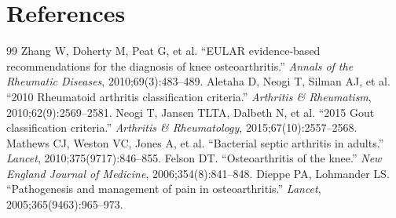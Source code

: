 \section*{References}
\begin{thebibliography}{99}
 Zhang W, Doherty M, Peat G, et al. ``EULAR evidence-based recommendations for the diagnosis of knee osteoarthritis.'' \textit{Annals of the Rheumatic Diseases}, 2010;69(3):483--489.
 Aletaha D, Neogi T, Silman AJ, et al. ``2010 Rheumatoid arthritis classification criteria.'' \textit{Arthritis \& Rheumatism}, 2010;62(9):2569--2581.
 Neogi T, Jansen TLTA, Dalbeth N, et al. ``2015 Gout classification criteria.'' \textit{Arthritis \& Rheumatology}, 2015;67(10):2557--2568.
 Mathews CJ, Weston VC, Jones A, et al. ``Bacterial septic arthritis in adults.'' \textit{Lancet}, 2010;375(9717):846--855.
 Felson DT. ``Osteoarthritis of the knee.'' \textit{New England Journal of Medicine}, 2006;354(8):841--848.
 Dieppe PA, Lohmander LS. ``Pathogenesis and management of pain in osteoarthritis.'' \textit{Lancet}, 2005;365(9463):965--973.

\end{thebibliography}
